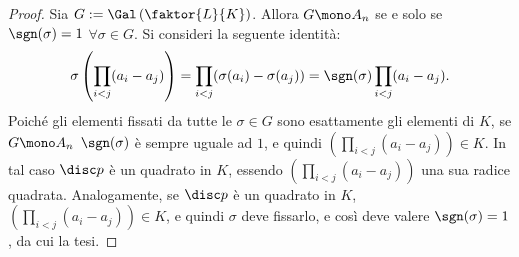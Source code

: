 \documentclass[11pt]{scrartcl}
\begin{document}
\begin{proof}
	Sia $G := \Gal\left(\faktor{L}{K}\right)$. Allora $G \mono A_n$ se e solo se
	$\sgn(\sigma) = 1$ $\forall \sigma \in G$. Si consideri la seguente identità:
	\[ \sigma\left(\prod_{i < j} (a_i - a_j)\right) = \prod_{i < j} (\sigma(a_i) - \sigma(a_j)) = \sgn(\sigma) \prod_{i < j} (a_i - a_j). \]
	Poiché gli elementi fissati da tutte le $\sigma \in G$ sono esattamente gli
	elementi di $K$, se $G \mono A_n$ $\sgn(\sigma)$ è sempre uguale ad $1$, e quindi
	$\left(\prod_{i < j} (a_i - a_j)\right) \in K$. In tal caso $\disc p$ è un
	quadrato in $K$, essendo $\left(\prod_{i < j} (a_i - a_j)\right)$ una sua
	radice quadrata. Analogamente, se $\disc p$ è un quadrato in $K$,
	$\left(\prod_{i < j} (a_i - a_j)\right) \in K$, e quindi
	$\sigma$ deve fissarlo, e così deve valere
	$\sgn(\sigma) = 1$, da cui la tesi.
\end{proof}
\end{document}
